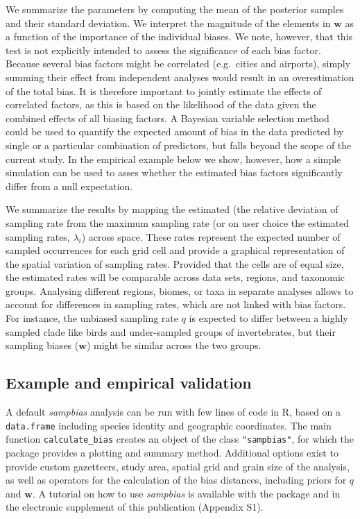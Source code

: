 \documentclass[
  12pt,
]{article}
\begin{document}
We summarize the parameters by computing the mean of the posterior samples and their standard deviation. We interpret the magnitude of the elements in \(\mathbf{w}\) as a function of the importance of the individual biases. We note, however, that this test is not explicitly intended to assess the significance of each bias factor. Because several bias factors might be correlated (e.g.~cities and airports), simply summing their effect from independent analyses would result in an overestimation of the total bias. It is therefore important to jointly estimate the effects of correlated factors, as this is based on the likelihood of the data given the combined effects of all biasing factors. A Bayesian variable selection method could be used to quantify the expected amount of bias in the data predicted by single or a particular combination of predictors, but falls beyond the scope of the current study. In the empirical example below we show, however, how a simple simulation can be used to asses whether the estimated bias factors significantly differ from a null expectation.

We summarize the results by mapping the estimated (the relative deviation of sampling rate from the maximum
sampling rate (or on user choice the estimated sampling rates, \(\lambda_i\)) across space. These rates represent the expected number of sampled occurrences for each grid cell and provide a graphical representation of the spatial variation of sampling rates. Provided that the cells are of equal size, the estimated rates will be comparable across data sets, regions, and taxonomic groups. Analysing different regions, biomes, or taxa in separate analyses allows to account for differences in sampling rates, which are not linked with bias factors. For instance, the unbiased sampling rate \(q\) is expected to differ between a highly sampled clade like birds and under-sampled groups of invertebrates, but their sampling biases (\(\mathbf{w}\)) might be similar across the two groups.

\hypertarget{example-and-empirical-validation}{%
\subsection{Example and empirical validation}\label{example-and-empirical-validation}}

A default \emph{sampbias} analysis can be run with few lines of code in R, based on a \texttt{data.frame} including species identity and geographic coordinates. The main function \texttt{calculate\_bias} creates an object of the class \texttt{"sampbias"}, for which the package provides a plotting and summary method. Additional options exist to provide custom gazetteers, study area, spatial grid and grain size of the analysis, as well as operators for the calculation of the bias distances, including priors for \(q\) and \(\mathbf{w}\). A tutorial on how to use \emph{sampbias} is available with the package and in the electronic supplement of this publication (Appendix S1).
\end{document}
